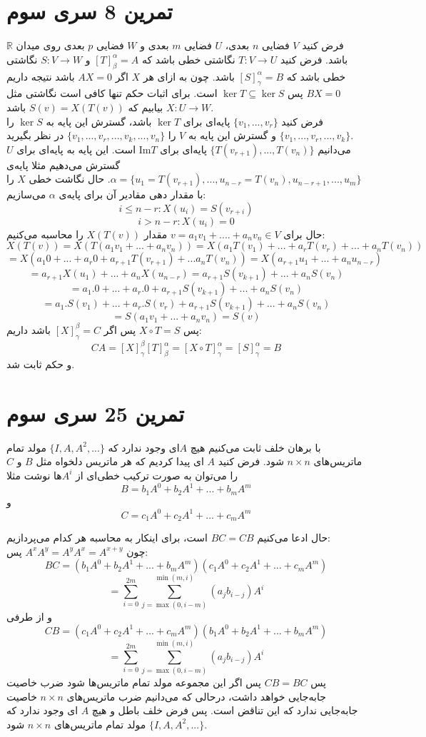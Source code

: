 \documentclass[12pt,a4paper]{article}
\begin{document}
\section{تمرین 8 سری سوم}
فرض کنید $V$ فضایی $n$ بعدی، $U$ فضایی $m$ بعدی و $W$ فضایی $p$ بعدی روی میدان $\mathbb{R}$ باشد. فرض کنید 
$T: V \rightarrow U$
نگاشتی خطی باشد که 
$[T]^\alpha_\beta = A$
و
$S: V \rightarrow W$
نگاشتی خطی باشد که 
$[S]^\alpha_\gamma = B$
باشد. چون به ازای هر $X$ اگر $AX = 0$ باشد نتیجه داریم $BX = 0$ پس
$\ker T \subseteq \ker S$
است. 
برای اثبات حکم تنها کافی است نگاشتی مثل 
$X: U \rightarrow W$
بیابیم که 
$S(v) = X(T(v))$
باشد.
\\
فرض کنید 
$\{v_1, ..., v_r\}$
پایه‌ای برای $\ker T$ باشد، گسترش این پایه به $\ker S$ را 
$\{v_1, ..., v_r, ..., v_k\}$
 و گسترش این پایه به $V$ را 
$\{v_1, ..., v_r, ..., v_k, ..., v_n\}$
در نظر بگیرید.
\\
می‌دانیم 
$\{T(v_{r+1}), ..., T(v_n)\}$
پایه‌ای برای $\text{Im} T$ است. این پایه به پایه‌ای برای $U$ گسترش می‌دهیم مثلا پایه‌ی
$\alpha = \{u_1 = T(v_{r+1}), ..., u_{n-r} = T(v_n), u_{n-r+1}, ..., u_m\}$.
حال نگاشت خطی $X$ را با مقدار دهی مقادیر آن برای پایه‌ی $\alpha$ می‌سازیم:
$$i \leq n-r: X(u_i) = S(v_{r+i})$$
$$i > n-r: X(u_i) = 0$$
حال برای 
$v = a_1 v_1 + ....+ a_n v_n \in V$
مقدار $X(T(v))$ را محاسبه می‌کنیم:
$$
X(T(v)) = X(T(a_1 v_1 + ... + a_n v_n))
= X(a_1 T(v_1) + ... + a_r T(v_r) + ... + a_n T(v_n))
$$$$
= X(a_1 0 + ... + a_r 0 + a_{r+1} T(v_{r+1}) + ... a_n T(v_n))
= X(a_{r+1} u_1 + ... + a_n u_{n-r})
$$$$
= a_{r+1} X(u_1) + ... + a_n X(u_{n-r})
= a_{r+1} S(v_{k+1}) + ... + a_n S(v_n)
$$$$
= a_1. 0 + ... + a_r.0 + a_{r+1} S(v_{k+1}) + ... + a_n S(v_n)
$$$$
= a_1. S(v_1) + ... + a_r.S(v_r) + a_{r+1} S(v_{k+1}) + ... + a_n S(v_n)
$$$$
= S(a_1 v_1 + ... + a_n v_n) = S(v)
$$
پس $X\circ T = S$ پس اگر 
$[X]^\beta_\gamma = C$
باشد داریم: 
$$CA = [X]^\beta_\gamma [T]^\alpha_\beta = [X\circ T]^\alpha_\gamma = [S]^\alpha_\gamma = B$$
و حکم ثابت شد.
\section{تمرین 25 سری سوم}
با برهان خلف ثابت می‌کنیم هیچ $A$ای وجود ندارد که 
$\{I, A, A^2, ...\}$
مولد تمام ماتریس‌های $n\times n$ شود.
فرض کنید $A$ ای پیدا کردیم که هر ماتریس دلخواه مثل $B$ و $C$ را می‌توان به صورت ترکیب خطی‌ای از $A^i$ها نوشت مثلا
$$B = b_1 A^{0} + b_2 A^{1} + ... +  b_m A^{m}$$
و
$$C = c_1 A^{0} + c_2 A^{1} + ... +  c_m A^{m}$$

حال ادعا می‌کنیم $BC = CB$ است، برای اینکار به محاسبه هر کدام می‌پردازیم:
\\
چون $A^x A^y = A^y A^x = A^{x+y}$ پس:
$$
BC = (b_1 A^{0} + b_2 A^{1} + ... +  b_m A^{m})(c_1 A^{0} + c_2 A^{1} + ... +  c_m A^{m})
$$$$
= \sum_{i=0}^{2m} \sum_{j=\max(0, i-m)}^{\min(m, i)}(a_j b_{i-j}) A^{i}
$$
و از طرفی
$$
CB = (c_1 A^{0} + c_2 A^{1} + ... +  c_m A^{m})(b_1 A^{0} + b_2 A^{1} + ... +  b_m A^{m})
$$$$
= \sum_{i=0}^{2m} \sum_{j=\max(0, i-m)}^{\min(m, i)}(a_j b_{i-j}) A^{i}
$$
پس $CB = BC$ پس اگر این مجموعه مولد تمام ماتریس‌ها شود ضرب خاصیت جابه‌جایی خواهد داشت، درحالی که می‌دانیم ضرب ماتریس‌های $n\times n$ خاصیت جابه‌جایی ندارد که این تناقض است. پس فرض خلف باطل و هیچ $A$ ای وجود ندارد که $\{I, A, A^2, ...\}$
مولد تمام ماتریس‌های $n\times n$ شود.
\end{document}

